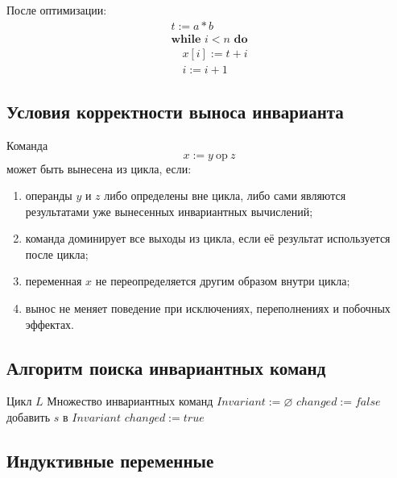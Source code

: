 \documentclass[12pt,a4paper]{article}
\begin{document}
После оптимизации:
\[
\begin{array}{l}
t := a*b\\
\textbf{while } i<n \textbf{ do}\\
\quad x[i] := t+i\\
\quad i := i+1
\end{array}
\]

\subsection{Условия корректности выноса инварианта}

Команда
\[
x := y \ \mathrm{op}\ z
\]
может быть вынесена из цикла, если:
\begin{enumerate}
    \item операнды $y$ и $z$ либо определены вне цикла, либо сами являются результатами уже вынесенных инвариантных вычислений;
    \item команда доминирует все выходы из цикла, если её результат используется после цикла;
    \item переменная $x$ не переопределяется другим образом внутри цикла;
    \item вынос не меняет поведение при исключениях, переполнениях и побочных эффектах.
\end{enumerate}

\subsection{Алгоритм поиска инвариантных команд}

\begin{algorithm}[H]
\caption{Поиск инвариантных команд цикла}
\begin{algorithmic}[1]
\Require Цикл $L$
\Ensure Множество инвариантных команд
\State $Invariant := \varnothing$
\Repeat
    \State $changed := false$
            \State добавить $s$ в $Invariant$
            \State $changed := true$
        \EndIf
    \EndFor
{}
\end{algorithmic}
\end{algorithm}

\subsection{Индуктивные переменные}
\end{document}
